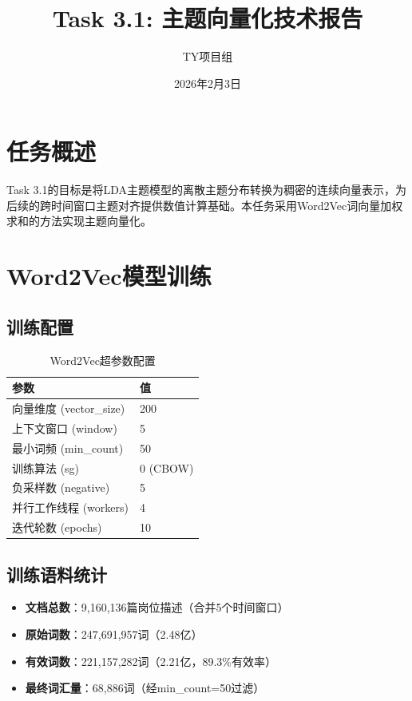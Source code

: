 \documentclass[11pt,a4paper]{article}
\title{\textbf{Task 3.1: 主题向量化技术报告}}
\author{TY项目组}
\date{2026年2月3日}
\begin{document}
\maketitle

\section{任务概述}

Task 3.1的目标是将LDA主题模型的离散主题分布转换为稠密的连续向量表示，为后续的跨时间窗口主题对齐提供数值计算基础。本任务采用Word2Vec词向量加权求和的方法实现主题向量化。

\section{Word2Vec模型训练}

\subsection{训练配置}

\begin{table}[h]
\centering
\begin{tabular}{ll}
\toprule
\textbf{参数} & \textbf{值} \\
\midrule
向量维度 (vector\_size) & 200 \\
上下文窗口 (window) & 5 \\
最小词频 (min\_count) & 50 \\
训练算法 (sg) & 0 (CBOW) \\
负采样数 (negative) & 5 \\
并行工作线程 (workers) & 4 \\
迭代轮数 (epochs) & 10 \\
\bottomrule
\end{tabular}
\caption{Word2Vec超参数配置}
\end{table}

\subsection{训练语料统计}

\begin{itemize}
    \item \textbf{文档总数}：9,160,136篇岗位描述（合并5个时间窗口）
    \item \textbf{原始词数}：247,691,957词（2.48亿）
    \item \textbf{有效词数}：221,157,282词（2.21亿，89.3\%有效率）
    \item \textbf{最终词汇量}：68,886词（经min\_count=50过滤）
\end{itemize}
\end{document}
